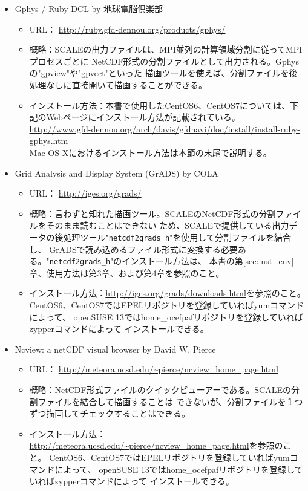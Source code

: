 \begin{itemize}
\item Gphys / Ruby-DCL by 地球電脳倶楽部\\
 \begin{itemize}
  \item URL： \url{http://ruby.gfd-dennou.org/products/gphys/}
  \item 概略：SCALEの出力ファイルは、MPI並列の計算領域分割に従ってMPIプロセスごとに
              NetCDF形式の分割ファイルとして出力される。Gphysの"gpview"や"gpvect"といった
              描画ツールを使えば、分割ファイルを後処理なしに直接開いて描画することができる。
  \item インストール方法：本書で使用したCentOS6、CentOS7については、下記のWebページにインストール方法が記載されている。\\
                        \url{http://www.gfd-dennou.org/arch/davis/gfdnavi/doc/install/install-ruby-gphys.htm}\\
                        Mac OS Xにおけるインストール方法は本節の末尾で説明する。
 \end{itemize}
\item Grid Analysis and Display System (GrADS) by COLA\\
 \begin{itemize}
  \item URL： \url{http://iges.org/grads/}
  \item 概略：言わずと知れた描画ツール。SCALEのNetCDF形式の分割ファイルをそのまま読むことはできない
             ため、SCALEで提供している出力データの後処理ツール"\verb|netcdf2grads_h|"を使用して分割ファイルを結合し、
             GrADSで読み込めるファイル形式に変換する必要ある。"\verb|netcdf2grads_h|"のインストール方法は、
本書の第\ref{sec:inst_env}章、使用方法は第3章、および第4章を参照のこと。
  \item インストール方法：\url{http://iges.org/grads/downloads.html}を参照のこと。
                        CentOS6、CentOS7ではEPELリポジトリを登録していればyumコマンドによって、
                        openSUSE 13ではhome\_ocefpafリポジトリを登録していればzypperコマンドによって
                        インストールできる。
 \end{itemize}
\item Ncview: a netCDF visual browser by David W. Pierce\\
 \begin{itemize}
  \item URL： \url{http://meteora.ucsd.edu/~pierce/ncview_home_page.html}
  \item 概略：NetCDF形式ファイルのクイックビューアーである。SCALEの分割ファイルを結合して描画することは
             できないが、分割ファイルを１つずつ描画してチェックすることはできる。
  \item インストール方法：\url{http://meteora.ucsd.edu/~pierce/ncview_home_page.html}を参照のこと。
                        CentOS6、CentOS7ではEPELリポジトリを登録していればyumコマンドによって、
                        openSUSE 13ではhome\_ocefpafリポジトリを登録していればzypperコマンドによって
                        インストールできる。
 \end{itemize}
\end{itemize}


